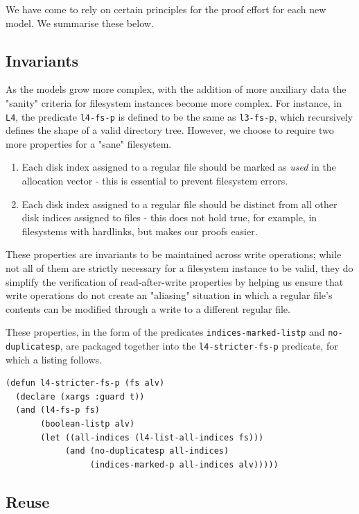 \documentclass[submission,copyright,creativecommons]{eptcs}
\begin{document}
We have come to rely on certain principles for the proof effort for
each new model. We summarise these below.

\subsection{Invariants}

As the models grow more complex, with the addition of more auxiliary
data the "sanity" criteria for filesystem instances become more
complex. For instance, in \texttt{L4}, the predicate \texttt{l4-fs-p}
is defined to be the same as \texttt{l3-fs-p}, which recursively
defines the shape of a valid directory tree. However, we choose to
require two more properties for a "sane" filesystem.

\begin{enumerate}
\item Each disk index assigned to a regular file should be
  marked as \textit{used} in the allocation vector - this is essential
  to prevent filesystem errors.
\item Each disk index assigned to a regular file should be distinct
  from all other disk indices assigned to files - this does not hold
  true, for example, in filesystems with hardlinks, but makes our
  proofs easier.
\end{enumerate}

These properties are invariants to be maintained across
write operations; while not all of them are strictly necessary for a
filesystem instance to be valid, they do simplify the verification of
read-after-write properties by helping us ensure that write operations
do not create an "aliasing" situation in which a regular file's
contents can be modified through a write to a different regular file.

These properties, in the form of the predicates
\texttt{indices-marked-listp} and \texttt{no-duplicatesp}, are
packaged together into the \texttt{l4-stricter-fs-p} predicate, for
which a listing follows.

\medskip

\noindent
\begin{verbatim}
(defun l4-stricter-fs-p (fs alv)
  (declare (xargs :guard t))
  (and (l4-fs-p fs)
       (boolean-listp alv)
       (let ((all-indices (l4-list-all-indices fs)))
            (and (no-duplicatesp all-indices)
                 (indices-marked-p all-indices alv)))))
\end{verbatim}

\subsection{Reuse}
\end{document}
